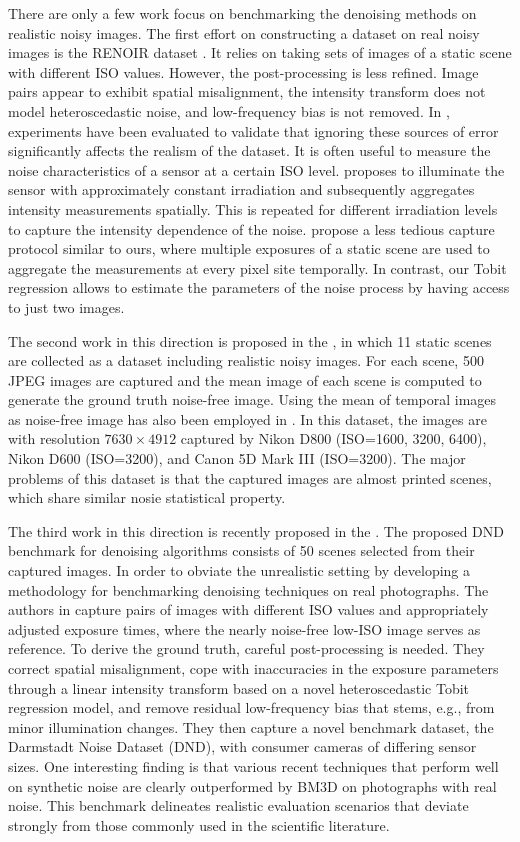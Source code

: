 There are only a few work focus on benchmarking the denoising methods on realistic noisy images. The first effort on constructing a dataset on real noisy images is the RENOIR dataset \cite{}. It relies on taking sets of images of a static scene with different ISO values. However, the post-processing is less refined. Image pairs appear to exhibit spatial misalignment, the intensity transform does not model heteroscedastic noise, and low-frequency bias is not removed. In \cite{}, experiments have been evaluated to validate that ignoring these sources of error significantly
affects the realism of the dataset. It is often useful to measure the noise characteristics of a sensor at a certain ISO level. \cite{} proposes to illuminate the sensor with approximately constant irradiation and subsequently aggregates intensity measurements spatially. This is repeated for different irradiation levels to capture the intensity dependence of the noise. \cite{} propose a less tedious capture protocol similar to ours, where multiple exposures of a static scene are used to aggregate the measurements at every pixel site temporally. In contrast, our Tobit regression allows to estimate the parameters of the noise process by having access to just two images.

The second work in this direction is proposed in the \cite{crosschannel}, in which 11 static scenes are collected as a dataset including realistic noisy images. For each scene, 500 JPEG images are captured and the mean image of each scene is computed to generate the ground truth noise-free image. Using the mean of temporal images as noise-free image has also been employed in \cite{Liu2008,liupractical}. In this dataset, the images are with resolution $7630\times4912$ captured by Nikon D800 (ISO=1600, 3200, 6400), Nikon D600 (ISO=3200), and Canon 5D Mark III (ISO=3200). The major problems of this dataset is that the captured images are almost printed scenes, which share similar nosie statistical property. 

The third work in this direction is recently proposed in the \cite{dndnoise}. The proposed DND benchmark for denoising algorithms consists of 50 scenes selected from their captured images. In order to obviate the unrealistic setting by developing a methodology for benchmarking denoising techniques on real photographs. The authors in \cite{dndnoise} capture pairs of images with different ISO values and appropriately adjusted exposure times, where the nearly noise-free low-ISO image serves as reference. To derive the ground truth, careful post-processing is needed. They correct spatial misalignment, cope with inaccuracies in the exposure parameters through a linear intensity transform based on a novel heteroscedastic Tobit regression model, and remove residual low-frequency bias that stems, e.g., from minor illumination changes. They then capture a novel benchmark dataset, the Darmstadt Noise Dataset (DND), with consumer cameras of differing sensor sizes. One interesting finding is that various recent techniques that perform well on synthetic noise are clearly outperformed by BM3D on photographs with real noise. This benchmark delineates realistic evaluation scenarios that deviate strongly from those commonly used in the scientific literature.


